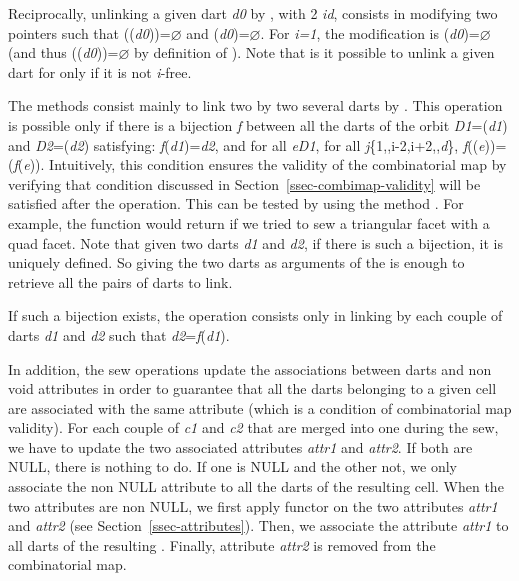 Reciprocally, unlinking a given dart \emph{d0} by \betai{}, with 2\myleq{}
\emph{i}\myleq{}\emph{d}, consists in modifying two \betai{} pointers
such that \betai{}(\betai{}(\emph{d0}))=$\varnothing$ and
\betai{}(\emph{d0})=$\varnothing$.  For \emph{i=1}, the modification is
\betaun{}(\emph{d0})=$\varnothing$ (and thus
\betazero{}(\betaun{}(\emph{d0}))=$\varnothing$ by definition of \betazero{}).  Note
that is it possible to unlink a given dart for \betai{} only if it is
not \emph{i}-free.

The  methods consist mainly to link two by two
several darts by \betai{}. This operation is possible only if there is
a bijection \emph{f} between all the darts of the orbit
\emph{D1}=\orbit{\betaun{},\myldots{},\betaimdeux{},\betaipdeux{},\myldots{},\betad{}}(\emph{d1}) and
\emph{D2}=\orbit{\betaun{},\myldots{},\betaimdeux{},\betaipdeux{},\myldots{},\betad{}}(\emph{d2})
satisfying: \emph{f}(\emph{d1})=\emph{d2}, and for all \emph{e}\myin{}\emph{D1}, 
for all \emph{j}\myin{}\{1,\myldots{},i-2,i+2,\myldots{},\emph{d}\},
\emph{f}(\betaj{}(\emph{e}))=\betajinv{}(\emph{f}(\emph{e})).  Intuitively, this condition
ensures the validity of the combinatorial map by verifying that
condition discussed in Section~\ref{ssec-combimap-validity} will be
satisfied after the operation.  This can be tested by using the method
. For example, the function
 would return  if we tried to sew a
triangular facet with a quad facet. Note that given two darts \emph{d1}
and \emph{d2}, if there is such a bijection, it is uniquely defined. So giving
the two darts as arguments of the  is enough to retrieve
all the pairs of darts to link.

If such a bijection exists, the  operation
consists only in linking by \betai{} each couple of darts \emph{d1} and
\emph{d2} such that \emph{d2}=\emph{f}(\emph{d1}).

In addition, the sew operations update the associations between darts
and non void attributes in order to guarantee that all the darts
belonging to a given cell are associated with the same attribute
(which is a condition of combinatorial map validity).  For each couple
of  \emph{c1} and \emph{c2} that are merged into one  during
the sew, we have to update the two associated attributes \emph{attr1} and
\emph{attr2}.  If both are NULL, there is nothing to do.  If one is NULL
and the other not, we only associate the non NULL attribute to all the
darts of the resulting cell.  When the two attributes are non NULL, we
first apply functor  on the two attributes \emph{attr1} and
\emph{attr2} (see Section~\ref{ssec-attributes}). Then, we associate the
attribute \emph{attr1} to all darts of the resulting . Finally,
attribute \emph{attr2} is removed from the combinatorial map. 

